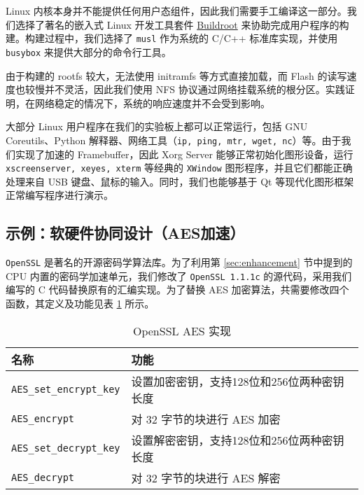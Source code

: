 Linux 内核本身并不能提供任何用户态组件，因此我们需要手工编译这一部分。我们选择了著名的嵌入式 Linux 开发工具套件 \href{https://buildroot.org/}{Buildroot} 来协助完成用户程序的构建。构建过程中，我们选择了 \texttt{musl} 作为系统的 C/C++ 标准库实现，并使用 \texttt{busybox} 来提供大部分的命令行工具。

由于构建的 rootfs 较大，无法使用 initramfs 等方式直接加载，而 Flash 的读写速度也较慢并不灵活，因此我们使用 NFS 协议通过网络挂载系统的根分区。实践证明，在网络稳定的情况下，系统的响应速度并不会受到影响。

大部分 Linux 用户程序在我们的实验板上都可以正常运行，包括 GNU Coreutils、Python 解释器、网络工具（\texttt{ip, ping, mtr, wget, nc}）等。由于我们实现了加速的 Framebuffer，因此 Xorg Server 能够正常初始化图形设备，运行 \texttt{xscreenserver, xeyes, xterm} 等经典的 \texttt{XWindow} 图形程序，并且它们都能正确处理来自 USB 键盘、鼠标的输入。同时，我们也能够基于 Qt 等现代化图形框架正常编写程序进行演示。



\subsection{示例：软硬件协同设计（AES加速）}

\texttt{OpenSSL} 是著名的开源密码学算法库。为了利用第 \ref{sec:enhancement} 节中提到的 CPU 内置的密码学加速单元，我们修改了 \texttt{OpenSSL 1.1.1c} 的源代码，采用我们编写的 C 代码替换原有的汇编实现。为了替换 AES 加密算法，共需要修改四个函数，其定义及功能见表 \ref{table:openssl} 所示。

\begin{table}[htbp]
    \centering
    \caption{OpenSSL AES 实现}
    \label{table:openssl}
\begin{tabular}{|l|l|}
\hline
名称 & 功能 \\ \hline
\texttt{AES\_set\_encrypt\_key} & 设置加密密钥，支持128位和256位两种密钥长度 \\ \hline
\texttt{AES\_encrypt} & 对 32 字节的块进行 AES 加密 \\ \hline
\texttt{AES\_set\_decrypt\_key} & 设置解密密钥，支持128位和256位两种密钥长度 \\ \hline
\texttt{AES\_decrypt} & 对 32 字节的块进行 AES 解密 \\ \hline
\end{tabular}
\end{table}

